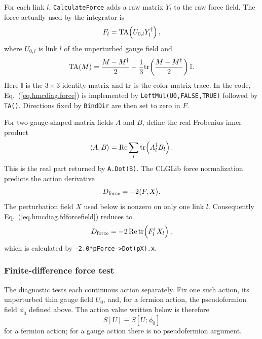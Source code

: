 For each link $l$, \texttt{CalculateForce} adds a raw matrix $Y_l$ to the raw
force field.  The force actually used by the integrator is
\begin{equation}
F_l={\rm TA}\!\left(U_{0,l}Y_l^\dagger\right),
\label{eq.hmcdiag.force}
\end{equation}
where $U_{0,l}$ is link $l$ of the unperturbed gauge field and
\begin{equation}
{\rm TA}(M)
=\frac{M-M^\dagger}{2}
-\frac{1}{3}{\rm tr}\!\left(\frac{M-M^\dagger}{2}\right)\mathbb I.
\label{eq.hmcdiag.ta}
\end{equation}
Here $\mathbb I$ is the $3\times3$ identity matrix and ${\rm tr}$ is the
color-matrix trace.
In the code, Eq.~(\ref{eq.hmcdiag.force}) is implemented by
\texttt{LeftMul(U0,FALSE,TRUE)} followed by \texttt{TA()}.  Directions fixed
by \texttt{BindDir} are then set to zero in $F$.

For two gauge-shaped matrix fields $A$ and $B$, define the real Frobenius inner
product
\begin{equation}
\langle A,B\rangle
=\mathop{\rm Re}\sum_l {\rm tr}\!\left(A_l^\dagger B_l\right).
\label{eq.hmcdiag.inner}
\end{equation}
This is the real part returned by \texttt{A.Dot(B)}.  The CLGLib force
normalization predicts the action derivative
\begin{equation}
D_{\rm force}=-2\langle F,X\rangle.
\label{eq.hmcdiag.fdforcefield}
\end{equation}
The perturbation field $X$ used below is nonzero on only one link $l$.
Consequently Eq.~(\ref{eq.hmcdiag.fdforcefield}) reduces to
\begin{equation}
D_{\rm force}
=-2\mathop{\rm Re}{\rm tr}\!\left(F_l^\dagger X_l\right),
\label{eq.hmcdiag.fdforce}
\end{equation}
which is calculated by
\texttt{-2.0*pForce->Dot(pX).x}.

\subsubsection{\label{sec:hmcdiag_fd}Finite-difference force test}

The diagnostic tests each continuous action separately.  Fix one such action,
its unperturbed thin gauge field $U_0$, and, for a fermion action, the
pseudofermion field $\phi_0$ defined above.  The action value written below is
therefore
\begin{equation}
S[U]\equiv S[U;\phi_0]
\end{equation}
for a fermion action; for a gauge action there is no pseudofermion argument.

